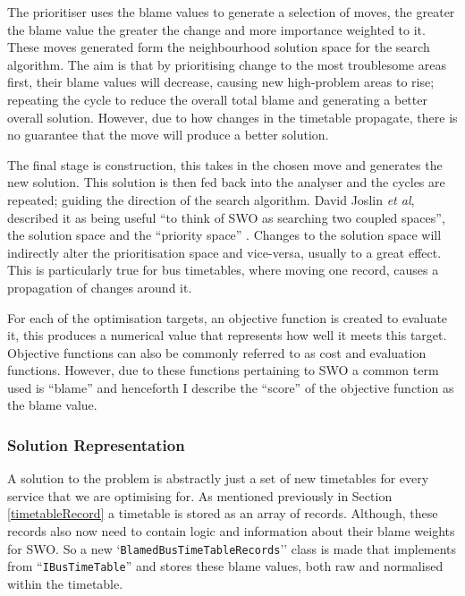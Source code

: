 \documentclass{article}
\begin{document}
\par
The prioritiser uses the blame values to generate a selection of moves, the greater the blame value the greater the change and more importance weighted to it. These moves generated form the neighbourhood solution space for the search algorithm. The aim is that by prioritising change to the most troublesome areas first, their blame values will decrease, causing new high-problem areas to rise; repeating the cycle to reduce the overall total blame and generating a better overall solution. However, due to how changes in the timetable propagate, there is no guarantee that the move will produce a better solution. 

\par 
The final stage is construction, this takes in the chosen move and generates the new solution. This solution is then fed back into the analyser and the cycles are repeated; guiding the direction of the search algorithm. David Joslin \textsl{et al}, described it as being useful ``to think of SWO as searching two coupled spaces'', the solution space and the ``priority space'' \cite{RN39}. Changes to the solution space will indirectly alter the prioritisation space and vice-versa, usually to a great effect. This is particularly true for bus timetables, where moving one record, causes a propagation of changes around it. 


\par 
For each of the optimisation targets, an objective function is created to evaluate it, this produces a numerical value that represents how well it meets this target. Objective functions can also be commonly referred to as cost and evaluation functions. However, due to these functions pertaining to SWO a common term used is ``blame''\cite{RN39} and henceforth I describe the ``score'' of the objective function as the blame value.


\subsubsection{Solution Representation}

A solution to the problem is abstractly just a set of new timetables for every service that we are optimising for. As mentioned previously in Section \ref{timetableRecord} a timetable is stored as an array of records. Although, these records also now need to contain logic and information about their blame weights for SWO. So a new `\texttt{BlamedBusTimeTableRecords}'' class is made that implements from ``\texttt{IBusTimeTable}'' and stores these blame values, both raw and normalised within the timetable.
\end{document}
